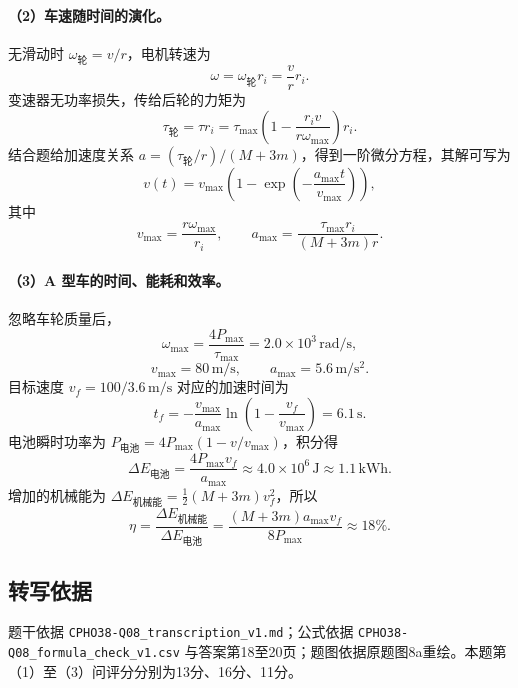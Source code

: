 \paragraph{（2）车速随时间的演化。}
无滑动时 $\omega_{\text{轮}}=v/r$，电机转速为
\[
\omega=\omega_{\text{轮}}r_i=\frac vr r_i.
\]
变速器无功率损失，传给后轮的力矩为
\[
\tau_{\text{轮}}=\tau r_i
=\tau_{\max}\left(1-\frac{r_iv}{r\omega_{\max}}\right)r_i.
\]
结合题给加速度关系 $a=(\tau_{\text{轮}}/r)/(M+3m)$，得到一阶微分方程，其解可写为
\[
\boxed{v(t)=v_{\max}\left(1-\exp\left(-\frac{a_{\max}t}{v_{\max}}\right)\right),}
\]
其中
\[
\boxed{v_{\max}=\frac{r\omega_{\max}}{r_i},\qquad
a_{\max}=\frac{\tau_{\max}r_i}{(M+3m)r}.}
\]

\paragraph{（3）A 型车的时间、能耗和效率。}
忽略车轮质量后，
\[
\omega_{\max}=\frac{4P_{\max}}{\tau_{\max}}
=2.0\times10^3\,\mathrm{rad/s},
\]
\[
v_{\max}=80\,\mathrm{m/s},\qquad
a_{\max}=5.6\,\mathrm{m/s^2}.
\]
目标速度 $v_f=100/3.6\,\mathrm{m/s}$ 对应的加速时间为
\[
\boxed{t_f=-\frac{v_{\max}}{a_{\max}}
\ln\left(1-\frac{v_f}{v_{\max}}\right)=6.1\,\mathrm s.}
\]
电池瞬时功率为 $P_{\text{电池}}=4P_{\max}(1-v/v_{\max})$，积分得
\[
\Delta E_{\text{电池}}
=\frac{4P_{\max}v_f}{a_{\max}}
\approx4.0\times10^6\,\mathrm J
\approx1.1\,\mathrm{kWh}.
\]
增加的机械能为 $\Delta E_{\text{机械能}}=\frac12(M+3m)v_f^2$，所以
\[
\boxed{\eta=\frac{\Delta E_{\text{机械能}}}{\Delta E_{\text{电池}}}
=\frac{(M+3m)a_{\max}v_f}{8P_{\max}}
\approx18\%.}
\]

\subsection{转写依据}
题干依据 \texttt{CPHO38-Q08\_transcription\_v1.md}；公式依据 \texttt{CPHO38-Q08\_formula\_check\_v1.csv} 与答案第18至20页；题图依据原题图8a重绘。本题第（1）至（3）问评分分别为13分、16分、11分。
